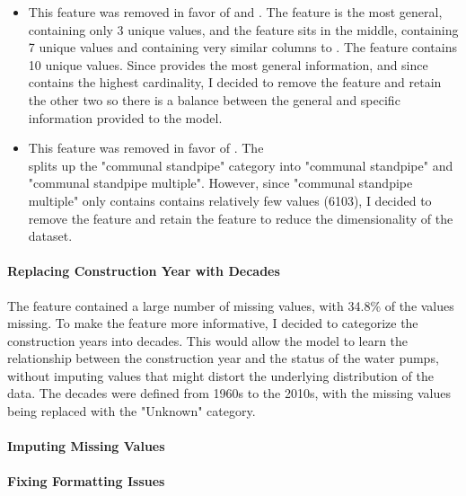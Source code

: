 \documentclass{article}
\begin{document}
\begin{itemize}
  \item {} This feature was removed in favor of  and . The  feature is the most general, containing only 3 unique values, and the  feature sits in the middle, containing 7 unique values and containing very similar columns to . The  feature contains 10 unique values. Since  provides the most general information, and since  contains the highest cardinality, I decided to remove the  feature and retain the other two so there is a balance between the general and specific information provided to the model.
  \item {} This feature was removed in favor of . The \\  splits up the "communal standpipe" category into "communal standpipe" and "communal standpipe multiple". However, since "communal standpipe multiple" only contains contains relatively few values (6103), I decided to remove the  feature and retain the  feature to reduce the dimensionality of the dataset.
\end{itemize}

\paragraph{Replacing Construction Year with Decades}
The  feature contained a large number of missing values, with 34.8\% of the values missing. To make the feature more informative, I decided to categorize the construction years into decades. This would allow the model to learn the relationship between the construction year and the status of the water pumps, without imputing values that might distort the underlying distribution of the data. The decades were defined from 1960s to the 2010s, with the missing values being replaced with the "Unknown" category.

\paragraph{Imputing Missing Values}
\paragraph{Fixing Formatting Issues}
\end{document}
